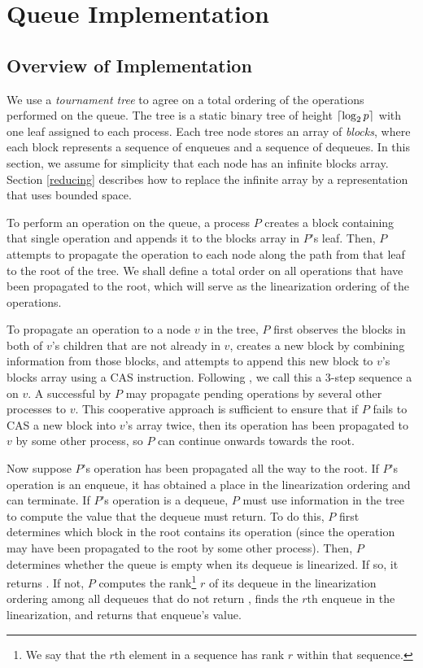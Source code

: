 
\section{Queue Implementation} \label{DescriptQ}

\subsection{Overview of Implementation}
We use a \emph{tournament tree} to agree on a total ordering of the operations performed on the queue.
The tree is a static binary tree of height $\lceil \log_2 p \rceil$ with one leaf 
assigned to each process. 
Each tree node  stores an array of \emph{blocks}, where each block represents a 
sequence of enqueues and a sequence of dequeues.
In this section, we assume for simplicity that each node has an infinite blocks array.
Section \ref{reducing} describes how to replace the infinite array by a representation that uses bounded space.

To perform an operation on the queue, a process $P$ creates a block containing that single 
operation and appends it to the blocks array in $P$'s leaf.
Then, $P$ attempts to propagate the operation to each node along the path from that leaf to the root of the tree.
We shall define a total order on all operations that have been propagated to the root, which 
will serve as the linearization ordering of the operations.

To propagate an operation to a node $v$ in the tree, $P$ first observes
the blocks in both of $v$'s children that are not already in $v$,
creates a new block by combining information from those blocks, and attempts to append this 
new block to $v$'s blocks array using a CAS instruction.
Following \cite{}, we call this a 3-step sequence a
 on $v$. %
A successful  by $P$ may propagate pending operations by several other processes to $v$.
This cooperative approach is sufficient to ensure that if $P$ fails to CAS a 
new block into $v$'s array twice,
then its operation has been propagated to $v$ by some other process, so $P$ can continue 
onwards towards the root.

Now suppose $P$'s operation has been propagated all the way to the root.
If $P$'s operation is an enqueue, it has obtained a place in the linearization ordering and can terminate.
If $P$'s operation is a dequeue, $P$ must use information in the tree to compute the value that the
dequeue must return.  To do this, $P$ first determines which block in the root contains its operation
(since the operation may have been propagated to the root by some other process).
Then, $P$ determines whether the queue is empty when its dequeue is linearized. If so, it returns \nil.
If not, $P$ computes the rank\footnote{We say that the $r$th element in a sequence has rank $r$ within that sequence.} $r$ of its dequeue in the linearization ordering
among all dequeues that do not return \nil,
finds the $r$th enqueue in the linearization, and returns that enqueue's value.

